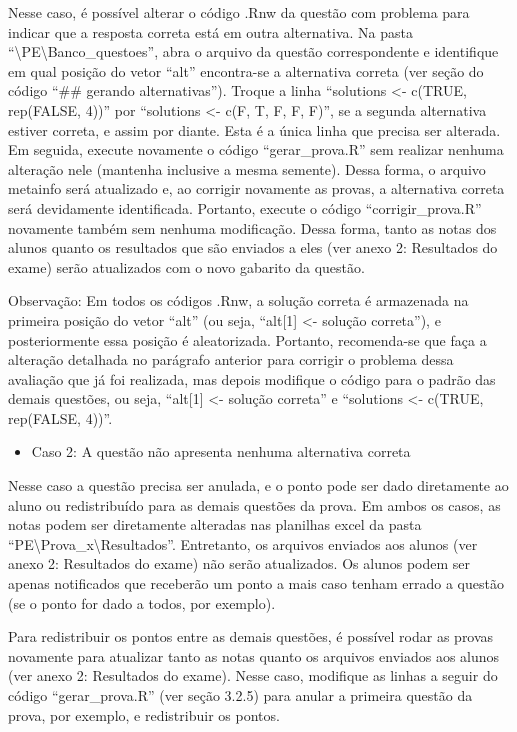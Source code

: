 \documentclass[a4paper]{report}
\providecommand{\tightlist}{%
  \setlength{\itemsep}{0pt}\setlength{\parskip}{0pt}}
\begin{document}
Nesse caso, é possível alterar o código .Rnw da questão com problema
para indicar que a resposta correta está em outra alternativa. Na pasta
``\textbackslash{}PE\textbackslash{}Banco\_questoes'', abra o arquivo da
questão correspondente e identifique em qual posição do vetor ``alt''
encontra-se a alternativa correta (ver seção do código ``\#\# gerando
alternativas''). Troque a linha ``solutions \textless{}- c(TRUE,
rep(FALSE, 4))'' por ``solutions \textless{}- c(F, T, F, F, F)'', se a
segunda alternativa estiver correta, e assim por diante. Esta é a única
linha que precisa ser alterada. Em seguida, execute novamente o código
``gerar\_prova.R'' sem realizar nenhuma alteração nele (mantenha
inclusive a mesma semente). Dessa forma, o arquivo metainfo será
atualizado e, ao corrigir novamente as provas, a alternativa correta
será devidamente identificada. Portanto, execute o código
``corrigir\_prova.R'' novamente também sem nenhuma modificação. Dessa
forma, tanto as notas dos alunos quanto os resultados que são enviados a
eles (ver anexo 2: Resultados do exame) serão atualizados com o novo
gabarito da questão.

Observação: Em todos os códigos .Rnw, a solução correta é armazenada na
primeira posição do vetor ``alt'' (ou seja, ``alt{[}1{]} \textless{}-
solução correta''), e posteriormente essa posição é aleatorizada.
Portanto, recomenda-se que faça a alteração detalhada no parágrafo
anterior para corrigir o problema dessa avaliação que já foi realizada,
mas depois modifique o código para o padrão das demais questões, ou
seja, ``alt{[}1{]} \textless{}- solução correta'' e ``solutions
\textless{}- c(TRUE, rep(FALSE, 4))''.

\begin{itemize}
\tightlist
\item
  Caso 2: A questão não apresenta nenhuma alternativa correta
\end{itemize}

Nesse caso a questão precisa ser anulada, e o ponto pode ser dado
diretamente ao aluno ou redistribuído para as demais questões da prova.
Em ambos os casos, as notas podem ser diretamente alteradas nas
planilhas excel da pasta
``PE\textbackslash{}Prova\_x\textbackslash{}Resultados''. Entretanto, os
arquivos enviados aos alunos (ver anexo 2: Resultados do exame) não
serão atualizados. Os alunos podem ser apenas notificados que receberão
um ponto a mais caso tenham errado a questão (se o ponto for dado a
todos, por exemplo).

Para redistribuir os pontos entre as demais questões, é possível rodar
as provas novamente para atualizar tanto as notas quanto os arquivos
enviados aos alunos (ver anexo 2: Resultados do exame). Nesse caso,
modifique as linhas a seguir do código ``gerar\_prova.R'' (ver seção
3.2.5) para anular a primeira questão da prova, por exemplo, e
redistribuir os pontos.
\end{document}
